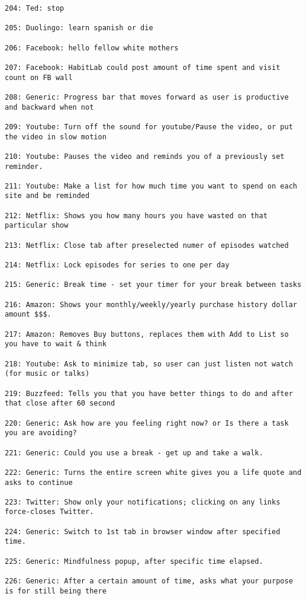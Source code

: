 \begin{lstlisting}[breaklines]
204: Ted: stop

205: Duolingo: learn spanish or die

206: Facebook: hello fellow white mothers

207: Facebook: HabitLab could post amount of time spent and visit count on FB wall

208: Generic: Progress bar that moves forward as user is productive and backward when not

209: Youtube: Turn off the sound for youtube/Pause the video, or put the video in slow motion

210: Youtube: Pauses the video and reminds you of a previously set reminder.

211: Youtube: Make a list for how much time you want to spend on each site and be reminded

212: Netflix: Shows you how many hours you have wasted on that particular show

213: Netflix: Close tab after preselected numer of episodes watched

214: Netflix: Lock episodes for series to one per day

215: Generic: Break time - set your timer for your break between tasks

216: Amazon: Shows your monthly/weekly/yearly purchase history dollar amount $$$.

217: Amazon: Removes Buy buttons, replaces them with Add to List so you have to wait & think

218: Youtube: Ask to minimize tab, so user can just listen not watch (for music or talks)

219: Buzzfeed: Tells you that you have better things to do and after that close after 60 second

220: Generic: Ask how are you feeling right now? or Is there a task you are avoiding?

221: Generic: Could you use a break - get up and take a walk.

222: Generic: Turns the entire screen white gives you a life quote and asks to continue

223: Twitter: Show only your notifications; clicking on any links force-closes Twitter.

224: Generic: Switch to 1st tab in browser window after specified time.

225: Generic: Mindfulness popup, after specific time elapsed.

226: Generic: After a certain amount of time, asks what your purpose is for still being there


\end{lstlisting}
